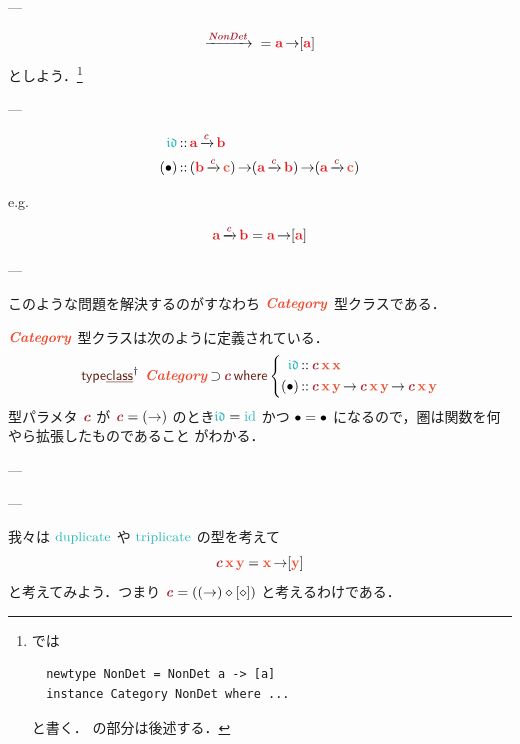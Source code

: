 \documentclass[a5paper,twoside,fleqn,draft]{jsbook}
\begin{document}
---

\begin{equation}
  \mCatArrow{\mTypeConstructor{NonDet}}{}
  =\hTypeName{a}\hFunctionArrow\hListConstruct{\hTypeName{a}}
\end{equation}
としよう．\footnote{\haskell では
\begin{verbatim}
  newtype NonDet = NonDet a -> [a]
  instance Category NonDet where ...
\end{verbatim}
と書く． の部分は後述する．}

---

\begin{align}
  \mIdCat
  &\hIsTypeOf{}\hTypeName{a}\mCatArrowC\hTypeName{b}\\
  (\mCompCat)
  &\hIsTypeOf{}(\hTypeName{b}\mCatArrowC\mC)
  \hFunctionArrow(\hTypeName{a}\mCatArrowC\hTypeName{b})
  \hFunctionArrow(\hTypeName{a}\mCatArrowC\mC)
\end{align}

e.g.

\begin{equation}
  \hTypeName{a}\mCatArrowC\hTypeName{b}
  =\hTypeName{a}\hFunctionArrow\hListConstruct{\hTypeName{a}}
\end{equation}

---


このような問題を解決するのがすなわち
$\mCatTypeClass$ 型クラスである．

$\mCatTypeClass$ 型クラスは次のように定義されている．
\begin{equation}
  \mTypeClassDeclPolymorphic\;
  \mCatTypeClass\hHasElementsOf\mTypeConstructor{c}
  \mWhere\left\{
  \begin{aligned}
    \mIdCat&\hIsTypeOf\mTypeConstructor{c}\,\mX\,\mX\\
    (\mCompCat)
    &\hIsTypeOf\mTypeConstructor{c}\,\mX\,\mY
    \hFunctionArrow\mTypeConstructor{c}\,\mX\,\mY
    \hFunctionArrow\mTypeConstructor{c}\,\mX\,\mY
  \end{aligned}
  \right.
\end{equation}
型パラメタ $\mTypeConstructor{c}$ が
$\mTypeConstructor{c}=(\hFunctionArrow)$ のとき$\mIdCat=\mId$ かつ
$\operatorname{\bullet}=\operatorname{\bullet}$ になるので，圏は関数を何やら拡張したものであること
がわかる．

---

---

我々は $\mDuplicate$ や $\mTriplicate$ の型を考えて
\begin{equation}
  \mTypeConstructor{c}\,\mX\,\mY
  =\mX\hFunctionArrow[\mY]
\end{equation}
と考えてみよう．つまり
$\mTypeConstructor{c}=((\hFunctionArrow)\hAnonParam[\hAnonParam])$
と考えるわけである．
\end{document}

